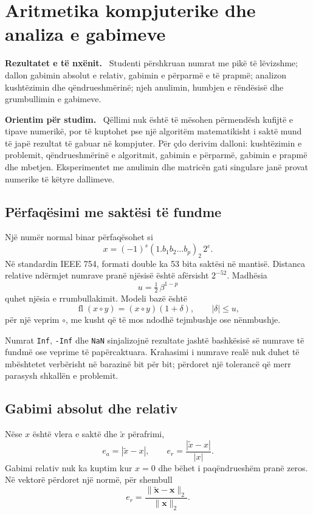 \documentclass[11pt,oneside,openany]{book}
\newcommand{\vect}[1]{\bm{#1}}
\newenvironment{qellime}{\par\medskip\noindent\textbf{Rezultatet e të nxënit.}\ }{\par\medskip}
\newenvironment{orientim}{\par\medskip\noindent\textbf{Orientim për studim.}\ }{\par\medskip}
\begin{document}
\chapter{Aritmetika kompjuterike dhe analiza e gabimeve}
\begin{qellime}
Studenti përshkruan numrat me pikë të lëvizshme; dallon gabimin absolut e relativ, gabimin e përparmë e të prapmë; analizon kushtëzimin dhe qëndrueshmërinë; njeh anulimin, humbjen e rëndësisë dhe grumbullimin e gabimeve.
\end{qellime}

\begin{orientim}
Qëllimi nuk është të mësohen përmendësh kufijtë e tipave numerikë, por të
kuptohet pse një algoritëm matematikisht i saktë mund të japë rezultat të
gabuar në kompjuter. Për çdo derivim dalloni: kushtëzimin e problemit,
qëndrueshmërinë e algoritmit, gabimin e përparmë, gabimin e prapmë dhe
mbetjen. Eksperimentet me anulimin dhe matricën gati singulare janë provat
numerike të këtyre dallimeve.
\end{orientim}


\section{Përfaqësimi me saktësi të fundme}
Një numër normal binar përfaqësohet si
\begin{equation}
 x=(-1)^s(1.b_1b_2\ldots b_p)_2\,2^e.
\end{equation}
Në standardin IEEE 754, formati double ka 53 bita saktësi në mantisë. Distanca relative ndërmjet numrave pranë njësisë është afërsisht $2^{-52}$. Madhësia
\begin{equation}
 u=\tfrac12\,\beta^{1-p}
\end{equation}
quhet njësia e rrumbullakimit. Modeli bazë është
\begin{equation}
 \operatorname{fl}(x\circ y)=(x\circ y)(1+\delta),\qquad |\delta|\le u,
\end{equation}
për një veprim $\circ$, me kusht që të mos ndodhë tejmbushje ose nënmbushje.

Numrat \texttt{Inf}, \texttt{-Inf} dhe \texttt{NaN} sinjalizojnë rezultate jashtë bashkësisë së numrave të fundmë ose veprime të papërcaktuara. Krahasimi i numrave realë nuk duhet të mbështetet verbërisht në barazinë bit për bit; përdoret një tolerancë që merr parasysh shkallën e problemit.

\section{Gabimi absolut dhe relativ}
Nëse $x$ është vlera e saktë dhe $\tilde x$ përafrimi,
\begin{equation}
 e_a=|\tilde x-x|,\qquad e_r=\frac{|\tilde x-x|}{|x|}.
\end{equation}
Gabimi relativ nuk ka kuptim kur $x=0$ dhe bëhet i paqëndrueshëm pranë zeros. Në vektorë përdoret një normë, për shembull
\begin{equation}
 e_r=\frac{\|\tilde{\vect x}-\vect x\|_2}{\|\vect x\|_2}.
\end{equation}
\end{document}
